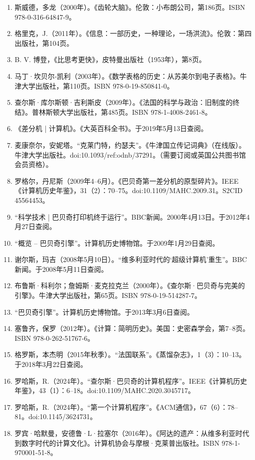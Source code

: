 \begin{enumerate}
\item 斯威德，多龙（2000年）。《齿轮大脑》。伦敦：小布朗公司，第186页。ISBN 978-0-316-64847-9。
\item 格里克，J.（2011年）。《信息：一部历史，一种理论，一场洪流》。伦敦：第四出版社，第104页。
\item B. V. 博登，《比思考更快》，皮特曼出版社（1953年），第8页。
\item 马丁·坎贝尔-凯利（2003年）。《数学表格的历史：从苏美尔到电子表格》。牛津大学出版社，第110页。ISBN 978-0-19-850841-0。
\item 查尔斯·库尔斯顿·吉利斯皮（2009年）。《法国的科学与政治：旧制度的终结》。普林斯顿大学出版社，第485页。ISBN 978-1-4008-2461-8。
\item 《差分机 | 计算机》。《大英百科全书》。于2019年5月13日查阅。
\item 麦康奈尔，安妮塔。“克莱门特，约瑟夫”。《牛津国立传记词典》（在线版）。牛津大学出版社。doi:10.1093/ref:odnb/37291。（需要订阅或英国公共图书馆会员资格）。
\item 罗格尔，丹尼斯（2009年4–6月）。《巴贝奇第一差分机的原型碎片》。IEEE《计算机历史年鉴》，31（2）：70–75。doi:10.1109/MAHC.2009.31。S2CID 45564453。
\item “科学技术 | 巴贝奇打印机终于运行”。BBC新闻。2000年4月13日。于2012年4月27日查阅。
\item “概览 – 巴贝奇引擎”。计算机历史博物馆。于2009年1月29日查阅。
\item 谢尔斯，玛吉（2008年5月10日）。“维多利亚时代的‘超级计算机’重生”。BBC新闻。于2008年5月11日查阅。
\item 布鲁斯·科利尔；詹姆斯·麦克拉克兰（2000年）。《查尔斯·巴贝奇与完美的引擎》。牛津大学出版社，第65页。ISBN 978-0-19-514287-7。
\item “巴贝奇引擎”。计算机历史博物馆。于2013年3月6日查阅。
\item 塞鲁齐，保罗（2012年）。《计算：简明历史》。美国：史密森学会，第7–8页。ISBN 978-0-262-51767-6。
\item 格罗斯，本杰明（2015年秋季）。“法国联系”。《蒸馏杂志》，1（3）：10–13。于2018年3月22日查阅。
\item 罗哈斯，R.（2024年）。“查尔斯·巴贝奇的计算机程序”。IEEE《计算机历史年鉴》，43（1）：6–18。doi:10.1109/MAHC.2020.3045717。
\item 罗哈斯，R.（2024年）。“第一个计算机程序”。《ACM通信》，67（6）：78–81。doi:10.1145/3624731。
\item 罗宾·哈默曼，安德鲁·L·拉塞尔（2016年）。《阿达的遗产：从维多利亚时代到数字时代的计算文化》。计算机协会与摩根·克莱普出版社。ISBN 978-1-970001-51-8。

\end{enumerate}
